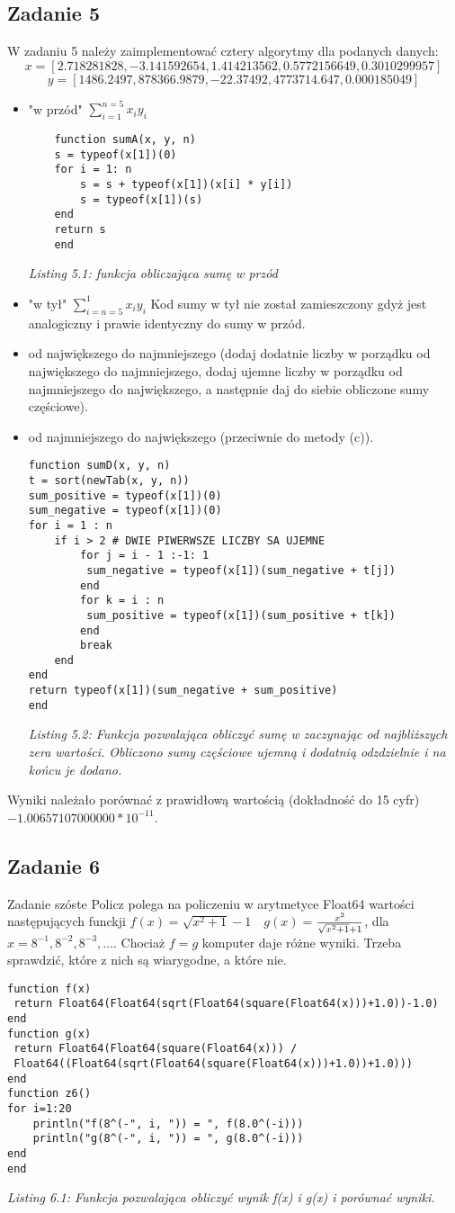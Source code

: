 \documentclass[]{article}
\begin{document}
\subsection{Zadanie 5}
W zadaniu 5 należy zaimplementować cztery algorytmy dla podanych danych:
\[x = [2.718281828, -3.141592654, 1.414213562, 0.5772156649, 0.3010299957]\]
\[y = [1486.2497, 878366.9879, -22.37492, 4773714.647, 0.000185049]\]
\begin{itemize}
	\item "w przód" \( \sum_{i = 1}^{n = 5}  x_iy_i \)
	\begin{lstlisting}
	function sumA(x, y, n)
	s = typeof(x[1])(0)
	for i = 1: n
		s = s + typeof(x[1])(x[i] * y[i])
		s = typeof(x[1])(s)
	end
	return s  
	end
	\end{lstlisting}
	\textit{Listing 5.1: funkcja obliczająca sumę w przód}
	\item "w tył" \( \sum_{i = n = 5}^{1}  x_iy_i \) Kod sumy w tył nie został zamieszczony gdyż jest analogiczny i prawie identyczny do sumy w przód.
	\item od największego do najmniejszego (dodaj dodatnie liczby w porządku od największego do najmniejszego, dodaj ujemne liczby w porządku od najmniejszego do największego, a następnie daj do siebie obliczone sumy częściowe).
	\item  od najmniejszego do największego (przeciwnie do metody (c)).
\begin{lstlisting}
function sumD(x, y, n)
t = sort(newTab(x, y, n))
sum_positive = typeof(x[1])(0)
sum_negative = typeof(x[1])(0)
for i = 1 : n
	if i > 2 # DWIE PIWERWSZE LICZBY SA UJEMNE
		for j = i - 1 :-1: 1
		 sum_negative = typeof(x[1])(sum_negative + t[j])
		end
		for k = i : n
		 sum_positive = typeof(x[1])(sum_positive + t[k])
		end
		break
	end
end
return typeof(x[1])(sum_negative + sum_positive)
end
\end{lstlisting}
\textit{Listing 5.2: Funkcja pozwalająca obliczyć sumę w zaczynając od najbliższych zera wartości. Obliczono sumy częściowe ujemną i dodatnią odzdzielnie i na końcu je dodano.}
\end{itemize}
Wyniki należało porównać z prawidłową wartością (dokładność do 15 cyfr) \(-1.00657107000000 * 10^{-11}\).

\subsection{Zadanie 6}
Zadanie szóste Policz polega na policzeniu w arytmetyce Float64 wartości następujących funckji \( f(x) = \sqrt{x^2 + 1} - 1\quad\)\(g(x) = \)\(x^2\over{\sqrt{x^2 + 1} + 1}\), dla \( x = 8^{-1}, 8^{-2}, 8^{-3}, ... \). Chociaż \(f = g\) komputer daje różne wyniki. Trzeba sprawdzić, które z nich są wiarygodne, a które nie.
\begin{lstlisting}
function f(x)
 return Float64(Float64(sqrt(Float64(square(Float64(x)))+1.0))-1.0)
end
function g(x)
 return Float64(Float64(square(Float64(x))) /
 Float64((Float64(sqrt(Float64(square(Float64(x)))+1.0))+1.0)))
end
function z6()
for i=1:20
	println("f(8^(-", i, ")) = ", f(8.0^(-i)))
	println("g(8^(-", i, ")) = ", g(8.0^(-i)))
end
end
\end{lstlisting}
\textit{Listing 6.1: Funkcja pozwalająca obliczyć wynik f(x) i g(x) i porównać wyniki.}
\end{document}
